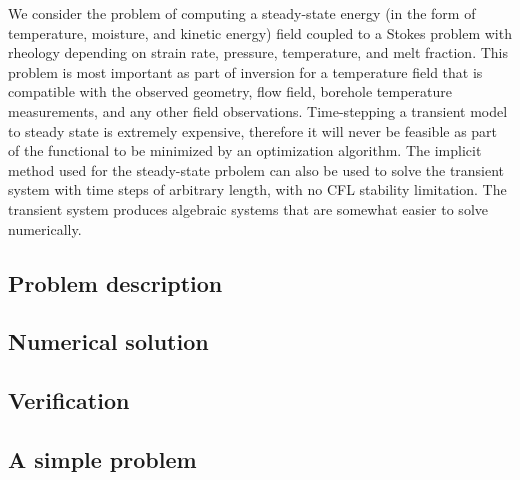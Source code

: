 We consider the problem of computing a steady-state energy (in the form of temperature, moisture, and kinetic energy) field coupled to a Stokes problem with rheology depending on strain rate, pressure, temperature, and melt fraction.
This problem is most important as part of inversion for a temperature field that is compatible with the observed geometry, flow field, borehole temperature measurements, and any other field observations.
Time-stepping a transient model to steady state is extremely expensive, therefore it will never be feasible as part of the functional to be minimized by an optimization algorithm.
The implicit method used for the steady-state prbolem can also be used to solve the transient system with time steps of arbitrary length, with no CFL stability limitation.
The transient system produces algebraic systems that are somewhat easier to solve numerically.

\subsection{Problem description}\label{ssec:vhtproblem}


\subsection{Numerical solution}\label{sec:vhtsolution}


\subsection{Verification}\label{ssec:vhtverif}


\subsection{A simple problem}\label{sec:vhtsimple}

